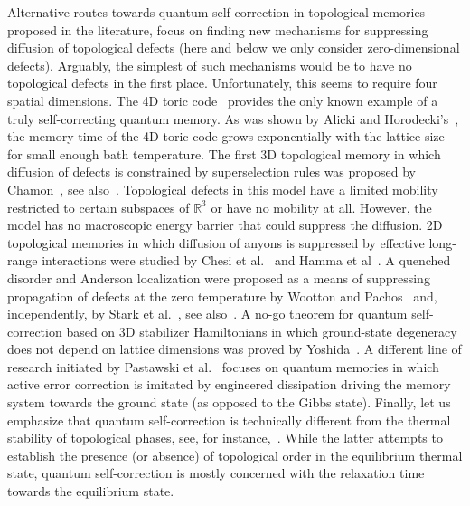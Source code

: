 Alternative routes towards quantum self-correction in topological memories proposed in the literature,
focus on  finding new mechanisms for suppressing diffusion of topological defects
(here and below we only consider zero-dimensional defects).
Arguably, the simplest of such mechanisms would be to have no topological defects in the first place.
Unfortunately, this seems to require four spatial dimensions.
The 4D toric code~\cite{DennisKitaevLandahlEtAl2002Topological} provides the only known example of a truly self-correcting quantum memory.
As was shown by Alicki and Horodecki's~\cite{AlickiHorodeckiHorodeckiEtAl2010thermal},
the memory time of the 4D toric code
grows exponentially with the lattice size for small enough bath temperature.
The first  3D topological memory in which diffusion of defects is constrained by superselection
rules was proposed by Chamon~\cite{Chamon2005Quantum}, see also~\cite{BravyiLeemhuisTerhal2011Topological}.
Topological defects in this model have a limited mobility restricted to certain
subspaces of $\mathbb{R}^3$ or have no mobility at all.
However, the model has no macroscopic energy barrier that could suppress the diffusion.
2D topological memories
in which diffusion of anyons is suppressed by effective long-range interactions
were studied by Chesi et al.~\cite{ChesiRoethlisbergerLoss2010Self-Correcting}
and Hamma et al~\cite{HammaCastelnovoChamon2009ToricBoson}.
A quenched disorder and Anderson localization were proposed as
a means of suppressing propagation of defects at the zero temperature
by Wootton and Pachos~\cite{WoottonPachos2011disorder} and,
independently, by Stark et al.~\cite{StarkImamogluRenner2011Localization},
see also~\cite{BravyiKoenig2011}.
A no-go theorem for quantum self-correction based on 3D stabilizer Hamiltonians
in which ground-state degeneracy does not depend on lattice dimensions
was proved by Yoshida~\cite{Yoshida2011feasibility}.
A different line of research initiated
by Pastawski et al.~\cite{PastawskiClementeCirac2011dissipation}
focuses  on quantum memories in which active error correction
is imitated by engineered dissipation driving the memory system
towards the ground state (as opposed to the Gibbs state).
Finally, let us emphasize that quantum  self-correction is technically different from
the thermal stability of topological phases,
see, for instance,~\cite{CastelnovoChamon2007Entanglement,
IblisdirEtAl2010thermal,
NussinovOrtiz2008Autocorrelations,
Hastings2011warmTQO}.
While the latter  attempts to establish the presence (or absence) of topological order
in the equilibrium thermal state, quantum self-correction is mostly concerned with the relaxation time
towards the equilibrium state.

